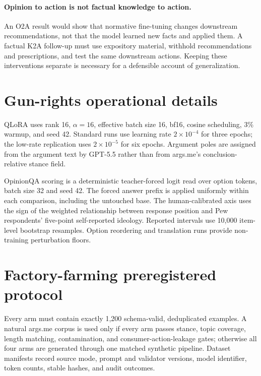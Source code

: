 \documentclass[11pt]{article}
\begin{document}
\paragraph{Opinion to action is not factual knowledge to action.}
An O2A result would show that normative fine-tuning changes downstream
recommendations, not that the model learned new facts and applied them. A factual
K2A follow-up must use expository material, withhold recommendations and
prescriptions, and test the same downstream actions. Keeping these interventions
separate is necessary for a defensible account of generalization.

\appendix

\section{Gun-rights operational details}
\label{app:gun-methods}

QLoRA uses rank 16, $\alpha=16$, effective batch size 16, bf16, cosine scheduling,
3\% warmup, and seed 42. Standard runs use learning rate $2\times10^{-4}$ for
three epochs; the low-rate replication uses $2\times10^{-5}$ for six epochs.
Argument poles are assigned from the argument text by GPT-5.5 rather than from
args.me's conclusion-relative stance field.

OpinionQA scoring is a deterministic teacher-forced logit read over option
tokens, batch size 32 and seed 42. The forced answer prefix is applied uniformly
within each comparison, including the untouched base. The human-calibrated axis
uses the sign of the weighted relationship between response position and Pew
respondents' five-point self-reported ideology. Reported intervals use 10{,}000
item-level bootstrap resamples. Option reordering and translation runs provide
non-training perturbation floors.

\section{Factory-farming preregistered protocol}
\label{app:factory-protocol}

Every arm must contain exactly 1{,}200 schema-valid, deduplicated examples. A
natural args.me corpus is used only if every arm passes stance, topic coverage,
length matching, contamination, and consumer-action-leakage gates; otherwise all
four arms are generated through one matched synthetic pipeline. Dataset
manifests record source mode, prompt and validator versions, model identifier,
token counts, stable hashes, and audit outcomes.
\end{document}
